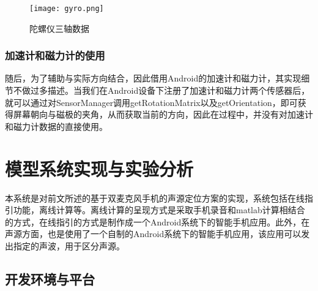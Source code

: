\documentclass[winfonts,oneside]{njuthesis}
\begin{document}
			\begin{figure}[H]
				\centering
				\texttt{[image: gyro.png]} 
				\caption{{陀螺仪三轴数据}}
				\label{fig: gyro}
			\end{figure}
		
		\subsection{加速计和磁力计的使用}	
			
			随后，为了辅助与实际方向结合，因此借用Android的加速计和磁力计，其实现细节不做过多描述。当我们在Android设备下注册了加速计和磁力计两个传感器后，就可以通过对SensorManager调用getRotationMatrix以及getOrientation，即可获得屏幕朝向与磁极的夹角，从而获取当前的方向，因此在过程中，并没有对加速计和磁力计数据的直接使用。
			
	
\chapter{模型系统实现与实验分析}
	
	本系统是对前文所述的基于双麦克风手机的声源定位方案的实现，系统包括在线指引功能，离线计算等。离线计算的呈现方式是采取手机录音和matlab计算相结合的方式，在线指引的方式是制作成一个Android系统下的智能手机应用。此外，在声源方面，也是使用了一个自制的Android系统下的智能手机应用，该应用可以发出指定的声波，用于区分声源。
	
	
	\section{开发环境与平台}
		
\end{document}
